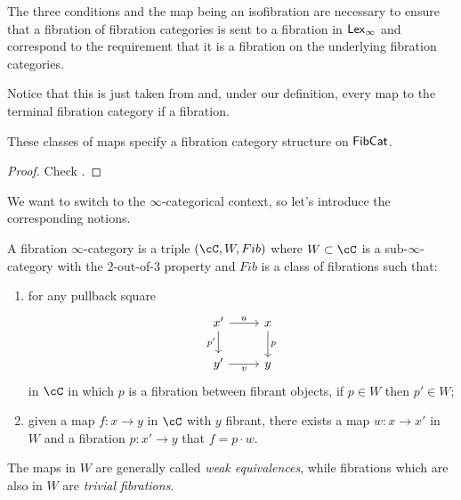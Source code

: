 \documentclass[a4paper,12pt,openany]{scrartcl}
\begin{document}
The three conditions and the map being an isofibration are necessary to ensure
that a fibration of fibration categories is sent to a fibration in $\operatorname{\mathsf{Lex}_\infty}$ and
correspond to the requirement that it is a fibration on the underlying fibration
categories.

Notice that this is just taken from \cite[Def.\ 4.3]{KS19} and, under our
definition, every map to the terminal fibration category if a fibration.

\begin{prop}
  These classes of maps specify a fibration category structure on $\operatorname{\mathsf{FibCat}}$.
\end{prop}
\begin{proof}
  Check \cite{KS19}.
\end{proof}

We want to switch to the $\infty$-categorical context, so let's introduce the
corresponding notions.

\begin{defn}
  A fibration $\infty$-category is a triple $(\cC,W,Fib)$ where $W\subset\cC$
  is a sub-$\infty$-category with the 2-out-of-3 property and $Fib$ is a class
  of fibrations such that:
  \begin{enumerate}
    \item for any pullback square
      \[\begin{tikzcd}
        {x'} & x \\
        {y'} & y
        \arrow["p", from=1-2, to=2-2]
        \arrow["{p'}"', from=1-1, to=2-1]
        \arrow["v"', from=2-1, to=2-2]
        \arrow["u", from=1-1, to=1-2]
      \end{tikzcd}\]
      in $\cC$ in which $p$ is a fibration between fibrant objects, if $p\in W$
      then $p'\in W$;
    \item given a map $f\colon x\rightarrow y$ in $\cC$ with $y$ fibrant, there
      exists a map $w\colon x\rightarrow x'$ in $W$ and a fibration $p\colon
      x'\rightarrow y$ that $f=p\cdot w$.
  \end{enumerate}
  The maps in $W$ are generally called \emph{weak equivalences}, while
  fibrations which are also in $W$ are \emph{trivial fibrations}.
\end{defn}
\end{document}
